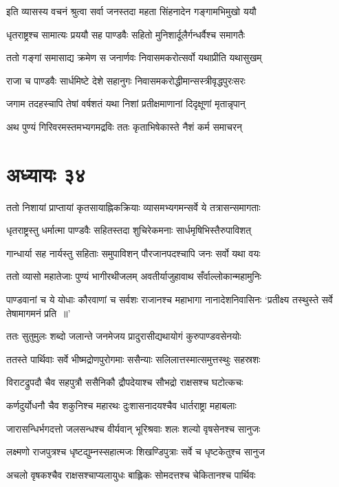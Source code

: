 \twolineshloka
{इति व्यासस्य वचनं श्रुत्वा सर्वा जनस्तदा}
{महता सिंहनादेन गङ्गामभिमुखो ययौ}


\twolineshloka
{धृतराष्ट्रश्च सामात्यः प्रययौ सह पाण्डवैः}
{सहितो मुनिशार्दूलैर्गन्धर्वैश्च समागतैः}


\twolineshloka
{ततो गङ्गां समासाद्य क्रमेण स जनार्णवः}
{निवासमकरोत्सर्वो यथाप्रीति यथासुखम्}


\twolineshloka
{राजा च पाण्डवैः सार्धमिष्टे देशे सहानुगः}
{निवासमकरोद्धीमान्सस्त्रीवृद्धपुरःसरः}


\twolineshloka
{जगाम तदहस्चापि तेषां वर्षशतं यथा}
{निशां प्रतीक्षमाणानां दिदृक्षूणां मृतान्नृपान्}


\twolineshloka
{अथ पुण्यं गिरिवरमस्तमभ्यगमद्रविः}
{ततः कृताभिषेकास्ते नैशं कर्म समाचरन्}


\chapter{अध्यायः ३४}
\twolineshloka
{ततो निशायां प्राप्तायां कृतसायाह्निकक्रियाः}
{व्यासमभ्यगमन्सर्वे ये तत्रासन्समागताः}


\twolineshloka
{धृतराष्ट्रस्तु धर्मात्मा पाण्डवैः सहितस्तदा}
{शुचिरेकमनाः सार्धमृषिभिस्तैरुपाविशत्}


\twolineshloka
{गान्धार्या सह नार्यस्तु सहिताः समुपाविशन्}
{पौरजानपदश्चापि जनः सर्वो यथा वयः}


\twolineshloka
{ततो व्यासो महातेजाः पुण्यं भागीरथीजलम्}
{अवतीर्याजुहावाथ सँर्वाल्लोकान्महामुनिः}


\threelineshloka
{पाण्डवानां च ये योधाः कौरवाणां च सर्वशः}
{राजानश्च महाभागा नानादेशनिवासिनः}
{`प्रतीक्ष्य तस्थुस्ते सर्वे तेषामागमनं प्रति ॥'}


\twolineshloka
{ततः सुतुमुलः शब्दो जलान्ते जनमेजय}
{प्रादुरासीद्यथायोगं कुरुपाण्डवसेनयोः}


\twolineshloka
{ततस्ते पार्थिवाः सर्वे भीष्मद्रोणपुरोगमाः}
{ससैन्याः सलिलात्तस्मात्समुत्तस्थुः सहस्रशः}


\twolineshloka
{विराटद्रुपदौ चैव सहपुत्रौ ससैनिकौ}
{द्रौपदेयाश्च सौभद्रो राक्षसश्च घटोत्कचः}


\twolineshloka
{कर्णदुर्योधनौ चैव शकुनिश्च महारथः}
{दुःशासनादयश्चैव धार्तराष्ट्रा महाबलाः}


\twolineshloka
{जारासन्धिर्भगदत्तो जलसन्धश्च वीर्यवान्}
{भूरिश्रवाः शलः शल्यो वृषसेनश्च सानुजः}


\twolineshloka
{लक्ष्मणो राजपुत्रश्च धृष्टद्युम्नस्सहात्मजः}
{शिखण्डिपुत्राः सर्वे च धृष्टकेतुश्च सानुज}


\twolineshloka
{अचलो वृषकश्चैव राक्षसश्चाप्यलायुधः}
{बाह्लिकः सोमदत्तश्च चेकितानश्च पार्थिवः}


